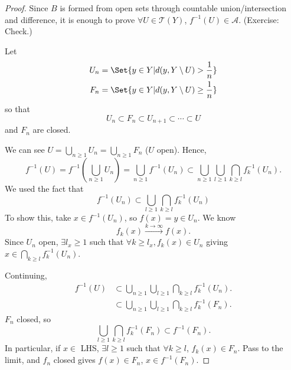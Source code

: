\documentclass{article}
\begin{document}
\begin{proof}
    Since $B$ is formed from open sets through countable union/intersection and difference, it is enough to prove $\forall U \in \mathscr{T}(Y)$, $f^{-1}(U) \in \mathscr{A}$. (Exercise: Check.)

    Let
    \begin{align*}
        U_n &= \Set{y \in Y | d(y, Y \setminus U) > \frac{1}{n}} \\
        F_n &= \Set{y \in Y | d(y, Y \setminus U) \geq \frac{1}{n}}
    \end{align*}
    so that
    \begin{equation*}
        U_n \subset F_n \subset U_{n+1} \subset \dotsb \subset U
    \end{equation*}
    and $F_n$ are closed.

    We can see $U = \bigcup_{n \geq 1} U_n = \bigcup_{n \geq 1} F_n$ ($U$ open). %
    Hence,
    \begin{equation*}
        f^{-1}(U) = f^{-1} \left(\bigcup_{n \geq 1} U_n\right) = \bigcup_{n \geq 1} f^{-1}(U_n) \subset \bigcup_{n \geq 1} \bigcup_{l \geq 1} \bigcap_{k \geq l} f^{-1}_k(U_n).
    \end{equation*}
    We used the fact that
    \begin{equation*}f^{-1}(U_n) \subset \bigcup_{l \geq 1} \bigcap_{k \geq l} f_k^{-1}(U_n)\end{equation*}
    To show this, take $x \in f^{-1}(U_n)$, so $f(x) = y \in U_n$.
    We know
    \begin{equation*}
        f_k(x) \xrightarrow{k \to \infty} f(x).
    \end{equation*}
    Since $U_n$ open, $\exists l_x \geq 1$ such that $\forall k \geq l_x, f_k(x) \in U_n$ giving $x \in \bigcap_{k \geq l} f_k^{-1}(U_n)$.

    Continuing,
    \begin{align*}
        f^{-1}(U) &\subset \bigcup_{n \geq 1} \bigcup_{l \geq 1} \bigcap_{k \geq l} f_k^{-1}(U_n). \\
        &\subset \bigcup_{n \geq 1} \bigcup_{l \geq 1} \bigcap_{k \geq l} f_k^{-1}(F_n).
    \end{align*}
    $F_n$ closed, so
    \begin{equation*}
        \bigcup_{l \geq 1} \bigcap_{k \geq l} f_k^{-1} (F_n) \subset f^{-1}(F_n).
    \end{equation*}
    In particular, if $x \in$ LHS, $\exists l \geq 1$ such that $\forall k \geq l$, $f_k(x) \in F_n$.
    Pass to the limit, and $f_n$ closed gives $f(x) \in F_n$, $x \in f^{-1}(F_n)$.


\end{proof}
\end{document}
